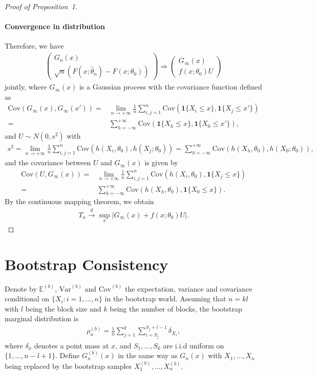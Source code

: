 \documentclass[12pt]{article}
\begin{document}
\begin{proof}[Proof of Proposition~1]
\paragraph{Convergence in distribution}
Therefore, we have
\begin{align*}
\begin{pmatrix}
G_n(x)  \\ 
\sqrt{n}(F(x;\hat{\theta}_n)-F(x;\theta_0))
\end{pmatrix}\Rightarrow
\begin{pmatrix}
G_{\infty}(x) \\
f(x;\theta_0)U
\end{pmatrix}
\end{align*}
jointly, where $G_{\infty}(x)$ is a Gaussian process with the covariance 
function defined as
\begin{align*}
\text{Cov}(G_{\infty}(x),G_{\infty}(x'))=& 
\lim_{n\rightarrow+\infty}\frac{1}{n}\sum^{n}_{i,j=1}
\text{Cov}(\mathbf{1}\{X_i\leq x\},\mathbf{1}\{X_j\leq x'\})
\\=& \sum^{+\infty}_{h=-\infty}\text{Cov}(\mathbf{1}\{X_{h}\leq x\},
\mathbf{1}\{X_0\leq x'\}),
\end{align*}
and $U\sim N(0, s^2)$ with 
\begin{align*}
s^2=\lim_{n\rightarrow+\infty}\frac{1}{n}\sum^{n}_{i,j=1}\text{Cov}(h(X_i,
\theta_0),h(X_j;\theta_0))
= \sum^{+\infty}_{h=-\infty}\text{Cov}(h(X_{h},\theta_0),h(X_0;\theta_0)),
\end{align*}
and the covariance between $U$ and $G_{\infty}(x)$ is given by
\begin{align*}
\text{Cov}(U,G_\infty(x))=&\lim_{n\rightarrow+\infty}
\frac{1}{n}\sum^{n}_{i,j=1}\text{Cov}(h(X_i,\theta_0),\mathbf{1}\{X_j\leq x\})
\\=&\sum^{+\infty}_{h=-\infty}
\text{Cov}(h(X_{h},\theta_0),\mathbf{1}\{X_0\leq x\}).
\end{align*}
By the continuous mapping theorem, we obtain
\begin{align*}
T_n \overset{d}{\rightarrow} \sup_x |G_{\infty}(x)+f(x;\theta_0)U|.    
\end{align*}

\end{proof}

\section{Bootstrap Consistency}

Denote by $\mathbb{E}^{(b)}$, $\text{Var}^{(b)}$ and $\text{Cov}^{(b)}$
the expectation, variance and covariance conditional on 
$\{X_i: i = 1, \ldots, n\}$ in 
the bootstrap world. Assuming that $n=kl$ with $l$ being the block size and $k$ 
being the number of blocks, the bootstrap marginal distribution is 
\begin{align*}
\rho_n^{(b)}=\frac{1}{n}\sum^{k}_{j=1}\sum^{S_j+l-1}_{i=S_j} \delta_{X_i},    
\end{align*}
where $\delta_x$ denotes a point mass at $x$, and $S_1,\dots,S_k$ are i.i.d 
uniform on $\{1,\dots,n-l+1\}$. 
Define $G_n^{(b)}(x)$ in the same way as $G_n(x)$ with $X_1, \dots, X_n$ being 
replaced by the bootstrap samples $X_1^{(b)},\dots,X_n^{(b)}.$
\end{document}
